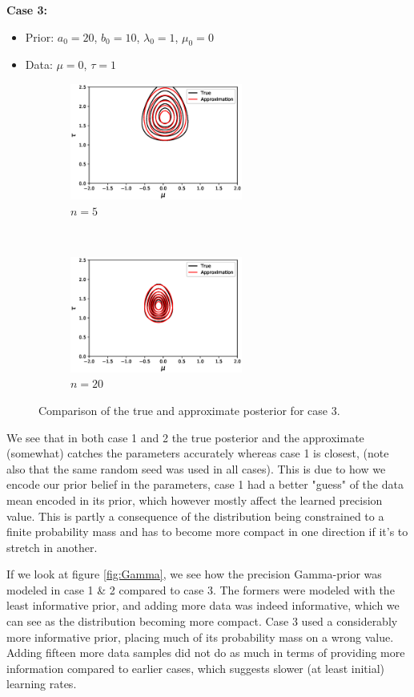 \documentclass[a4paper]{article}
\begin{document}
\textbf{Case 3:} 
\begin{itemize}
	\item Prior: $a_0=20$, $b_0= 10$, $\lambda_0=1$, $\mu_0 = 0$
	\item Data: $\mu=0$, $\tau=1$
\end{itemize}

\begin{figure}[h!]
	\centering
	\begin{subfigure}[t]{0.5\textwidth}
		\centering
		\includegraphics[height=1.5in]{Case3a.eps}
		\caption{$n=5$}
	\end{subfigure}%
	~ 
	\begin{subfigure}[t]{0.5\textwidth}
		\centering
		\includegraphics[height=1.5in]{Case3b.eps}
		\caption{$n=20$}
	\end{subfigure}
	\caption{Comparison of the true and approximate posterior for case 3.}
\end{figure}

\noindent We see that in both case 1 and 2 the true posterior and the approximate (somewhat) catches the parameters accurately whereas case 1 is closest, (note also that the same random seed was used in all cases). This is due to how we encode our prior belief in the parameters, case 1 had a better "guess" of the data mean encoded in its prior, which however mostly affect the learned precision value. This is partly a consequence of the distribution being constrained to a finite probability mass and has to become more compact in one direction if it's to stretch in another. 

If we look at figure \ref{fig:Gamma}, we see how the precision Gamma-prior was modeled in case 1 \& 2 compared to case 3. The formers were modeled with the least informative prior, and adding more data was indeed informative, which we can see as the distribution becoming more compact. Case 3 used a considerably more informative prior, placing much of its probability mass on a wrong value. Adding fifteen more data samples did not do as much in terms of providing more information compared to earlier cases, which suggests slower (at least initial) learning rates.
\end{document}
